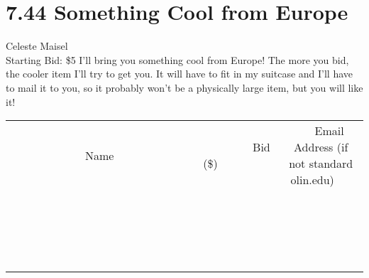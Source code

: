 \documentclass[11pt]{article}
\begin{document}
\section*{7.44 Something Cool from Europe}
Celeste Maisel
\\
Starting Bid: \$5
\newline
I'll bring you something cool from Europe!  The more you bid, the cooler item I'll try to get you.  It will have to fit in my suitcase and I'll have to mail it to you, so it probably won't be a physically large item, but you will like it!
\\[3ex]
\begin{tabular}{c c c}
~~~~~~~~~~~~~Name~~~~~~~~~~~~~ & ~~~~~~~~~Bid (\$)~~~~~~~~~  & ~~~Email Address (if not standard olin.edu)~~~\\
 & & \\
\hline
 & & \\
\hline
 & & \\
\hline
 & & \\
\hline
 & & \\
\hline
 & & \\
\hline
 & & \\
\hline
 & & \\
\hline
 & & \\
\hline
 & & \\
\hline
 & & \\
\hline
 & & \\
\hline
 & & \\
\hline
 & & \\
\hline
 & & \\
\hline
 & & \\
\hline
 & & \\
\hline
 & & \\
\hline
 & & \\
\hline
\end{tabular}
\newpage
\end{document}
